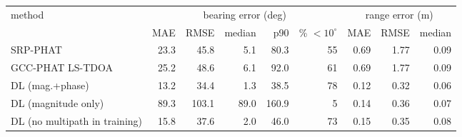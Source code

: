 \begin{tabular}{lrrrrrrrr}
\toprule
method & \multicolumn{5}{c}{bearing error (deg)} & \multicolumn{3}{c}{range error (m)}\\
\cmidrule(lr){2-6}\cmidrule(lr){7-9}
 & MAE & RMSE & median & p90 & \% $<10^\circ$ & MAE & RMSE & median\\
\midrule
SRP-PHAT & 23.3 & 45.8 & 5.1 & 80.3 & 55 & 0.69 & 1.77 & 0.09 \\
GCC-PHAT LS-TDOA & 25.2 & 48.6 & 6.1 & 92.0 & 61 & 0.69 & 1.77 & 0.09 \\
DL (mag.+phase) & 13.2 & 34.4 & 1.3 & 38.5 & 78 & 0.12 & 0.32 & 0.06 \\
DL (magnitude only) & 89.3 & 103.1 & 89.0 & 160.9 & 5 & 0.14 & 0.36 & 0.07 \\
DL (no multipath in training) & 15.8 & 37.6 & 2.0 & 46.0 & 73 & 0.15 & 0.35 & 0.08 \\
\bottomrule
\end{tabular}
